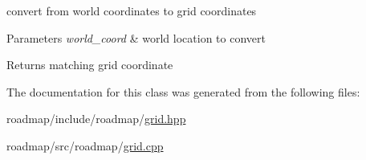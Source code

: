 convert from world coordinates to grid coordinates 


\begin{DoxyParams}{Parameters}
{\em world\+\_\+coord} & world location to convert \\
\hline
\end{DoxyParams}
\begin{DoxyReturn}{Returns}
matching grid coordinate 
\end{DoxyReturn}


The documentation for this class was generated from the following files\+:\begin{DoxyCompactItemize}
\item 
roadmap/include/roadmap/\hyperlink{grid_8hpp}{grid.\+hpp}\item 
roadmap/src/roadmap/\hyperlink{grid_8cpp}{grid.\+cpp}\end{DoxyCompactItemize}
